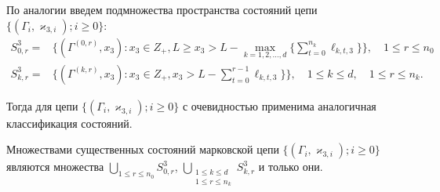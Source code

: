 \documentclass[a4paper,12pt,russian]{extarticle}
\newcommand{\ga}[1]{\Gamma^{\left( #1 \right)} }
\newcommand{\MarkThree}{\{(\Gamma_i, \varkappa_{3,i}); i \geqslant 0\}}
\begin{document}
По аналогии введем подмножества пространства состояний цепи $\MarkThree$:
\begin{equation*}
\begin{aligned}
S^3_{0,r} = & \{(\ga{0,r},x_3) \colon x_3\in Z_+, L \geqslant x_3 > L - \max\limits_{k=1, 2, \ldots, d}\{\sum_{t=0}^{n_k} \ell_{k,t,3}\}\}, \quad 1 \leqslant r \leqslant n_0 \\
S^3_{k,r} = & \{(\ga{k,r},x_3) \colon x_3\in Z_+, x_3 > L - \sum_{t=0}^{r-1} \ell_{k,t,3}\} \}, \quad 1 \leqslant k \leqslant d, \quad 1 \leqslant r \leqslant n_k.
\end{aligned}
\end{equation*}

Тогда для цепи $\MarkThree$ с очевидностью применима аналогичная классификация состояний.
\begin{theorem}
Множествами существенных состояний марковской цепи $\MarkThree$ являются множества $\bigcup\limits_{1 \leqslant r \leqslant n_0}S^3_{0,r}$, $\bigcup\limits_{\substack{1 \leqslant k \leqslant d\\ 1 \leqslant r \leqslant n_k}} S^3_{k,r}$ и только они.
\end{theorem}
\end{document}
